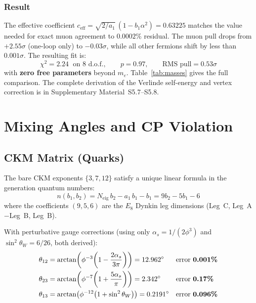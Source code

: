 \documentclass[12pt,a4paper]{article}
\theoremstyle{definition}
\begin{document}
\subsubsection*{Result}

The effective coefficient $c_{\mathrm{eff}} = \sqrt{2/a_1}\,(1 - b_1\alpha^2) = 0.63225$ matches the value needed for exact muon agreement to $0.0002\%$ residual.  The muon pull drops from $+2.55\sigma$ (one-loop only) to $-0.03\sigma$, while all other fermions shift by less than $0.001\sigma$.  The resulting fit is:
\begin{equation}
\chi^2 = 2.24 \;\text{ on 8 d.o.f.}, \qquad p = 0.97, \qquad \text{RMS pull} = 0.53\sigma
\label{eq:chi2_vertex}
\end{equation}
with \textbf{zero free parameters} beyond $m_e$.  Table~\ref{tab:masses} gives the full comparison.  The complete derivation of the Verlinde self-energy and vertex correction is in Supplementary Material~S5.7--S5.8.




\section{Mixing Angles and CP Violation}
\label{sec:mixing_cp}

\subsection{CKM Matrix (Quarks)}
\label{sec:ckm}

The bare CKM exponents $\{3, 7, 12\}$ satisfy a unique linear formula in the generation quantum numbers:
\begin{equation}
\boxed{n(b_1, b_2) = N_{\text{eig}}\, b_2 - a_1\, b_1 - b_1 = 9b_2 - 5b_1 - 6}
\end{equation}
where the coefficients $(9, 5, 6)$ are the $E_8$ Dynkin leg dimensions (Leg~C, Leg~A$-$Leg~B, Leg~B).

With perturbative gauge corrections (using only $\alpha_s = 1/(2\phi^3)$ and $\sin^2\theta_W = 6/26$, both derived):
\begin{align}
\theta_{12} &= \arctan\!\left(\phi^{-3}\!\left(1 - \frac{2\alpha_s}{3\pi}\right)\right) = 12.962^\circ && \text{error \textbf{0.001\%}} \\
\theta_{23} &= \arctan\!\left(\phi^{-7}\!\left(1 + \frac{5\alpha_s}{\pi}\right)\right) = 2.342^\circ && \text{error \textbf{0.17\%}} \\
\theta_{13} &= \arctan\!\left(\phi^{-12}\!\left(1 + \sin^2\theta_W\right)\right) = 0.2191^\circ && \text{error \textbf{0.096\%}}
\end{align}
\end{document}
